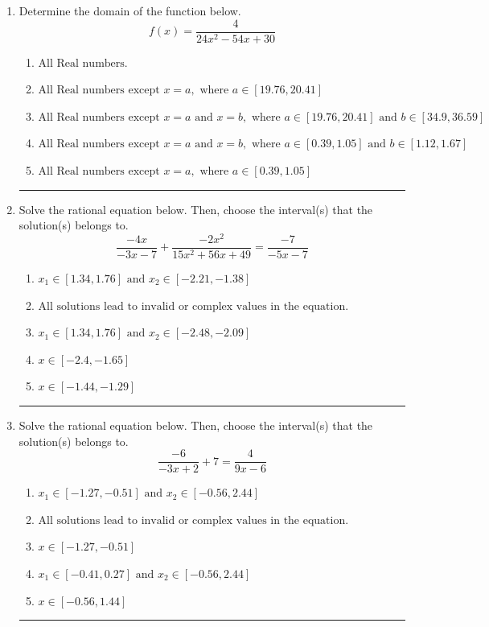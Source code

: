 \documentclass[14pt]{extbook}
\newcommand{\litem}[1]{\item#1\hspace*{-1cm}\rule{\textwidth}{0.4pt}}
\begin{document}
\begin{enumerate}
\litem{
Determine the domain of the function below.\[ f(x) = \frac{4}{24x^{2} -54 x + 30} \]\begin{enumerate}[label=\Alph*.]
\item \( \text{All Real numbers.} \)
\item \( \text{All Real numbers except } x = a, \text{ where } a \in [19.76, 20.41] \)
\item \( \text{All Real numbers except } x = a \text{ and } x = b, \text{ where } a \in [19.76, 20.41] \text{ and } b \in [34.9, 36.59] \)
\item \( \text{All Real numbers except } x = a \text{ and } x = b, \text{ where } a \in [0.39, 1.05] \text{ and } b \in [1.12, 1.67] \)
\item \( \text{All Real numbers except } x = a, \text{ where } a \in [0.39, 1.05] \)

\end{enumerate} }
\litem{
Solve the rational equation below. Then, choose the interval(s) that the solution(s) belongs to.\[ \frac{-4x}{-3x -7} + \frac{-2x^{2}}{15x^{2} +56 x + 49} = \frac{-7}{-5x -7} \]\begin{enumerate}[label=\Alph*.]
\item \( x_1 \in [1.34, 1.76] \text{ and } x_2 \in [-2.21,-1.38] \)
\item \( \text{All solutions lead to invalid or complex values in the equation.} \)
\item \( x_1 \in [1.34, 1.76] \text{ and } x_2 \in [-2.48,-2.09] \)
\item \( x \in [-2.4,-1.65] \)
\item \( x \in [-1.44,-1.29] \)

\end{enumerate} }
\litem{
Solve the rational equation below. Then, choose the interval(s) that the solution(s) belongs to.\[ \frac{-6}{-3x + 2} + 7 = \frac{4}{9x -6} \]\begin{enumerate}[label=\Alph*.]
\item \( x_1 \in [-1.27, -0.51] \text{ and } x_2 \in [-0.56,2.44] \)
\item \( \text{All solutions lead to invalid or complex values in the equation.} \)
\item \( x \in [-1.27,-0.51] \)
\item \( x_1 \in [-0.41, 0.27] \text{ and } x_2 \in [-0.56,2.44] \)
\item \( x \in [-0.56,1.44] \)


\end{enumerate}}
\end{enumerate}
\end{document}
